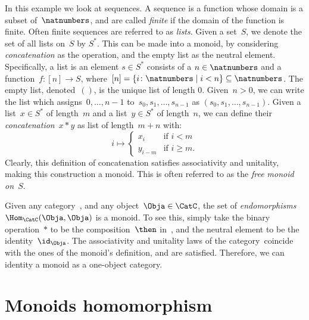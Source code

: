 \begin{example}
In this example we look at sequences. A sequence is a function whose domain is a subset of~$\natnumbers$, and are called \emph{finite} if the domain of the function is finite. Often finite sequences are referred to as \emph{lists}. Given a set~$S$, we denote the set of all lists on~$S$ by $S^\ast$. This can be made into a monoid, by considering \emph{concatenation} as the operation, and the empty list as the neutral element. Specifically, a list is an element $s\in S^\ast$ consists of a $n\in \natnumbers$ and a function~$f\colon [n]\to S$, where~$[n]=\{i\colon \natnumbers\mid i<n\}\subseteq \natnumbers$. The empty list, denoted~$()$, is the unique list of length 0. Given~$n>0$, we can write the list which assigns~$0,\ldots,n-1$ to~$s_0,s_1,\ldots,s_{n-1}$ as $(s_0,s_1,\ldots,s_{n-1})$. Given a list~$x\in S^\ast$ of length~$m$ and a list~$y\in S^\ast$ of length~$n$, we can define their \emph{concatenation}~$x*y$ as list of length~$m+n$ with:
\begin{equation*}
    i\mapsto
    \begin{cases}
    x_i&\text{if }i<m\\
    y_{i-m}&\text{if }i\geq m.
    \end{cases}
\end{equation*}
Clearly, this definition of concatenation satisfies associativity and unitality, making this construction a monoid. This is often referred to as the \emph{free monoid on~$S$}.
\end{example}

\begin{example}
Given any category~\CatC, and any object~$\Obja\in \CatC$, the set of \emph{endomorphisms}~$\Hom_{\CatC}(\Obja,\Obja)$ is a monoid. To see this, simply take the binary operation~$\ast$ to be the composition~$\then$ in~\CatC, and the neutral element to be the identity~$\id_\Obja$. The associativity and unitality laws of the category~\CatC coincide with the ones of the monoid's definition, and are satisfied. Therefore, we can identity a monoid as a one-object category.
\end{example}

\section{Monoids homomorphism}




